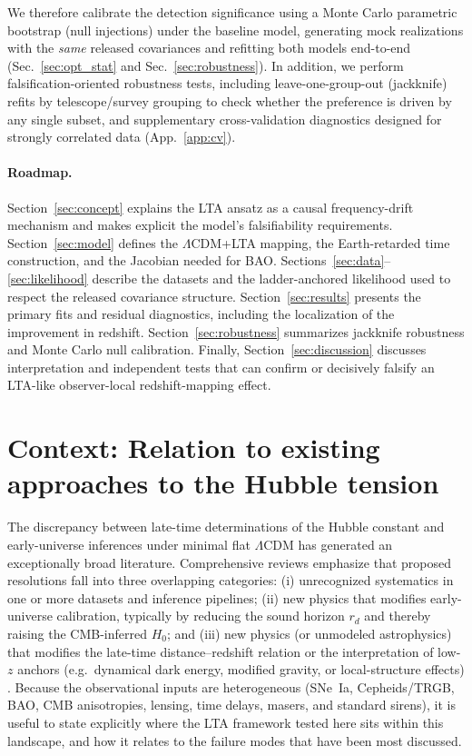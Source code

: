 \documentclass[10pt]{article}
\begin{document}
We therefore calibrate the detection significance using a Monte Carlo parametric bootstrap (null
injections) under the baseline model, generating mock realizations with the \emph{same} released
covariances and refitting both models end-to-end (Sec.~\ref{sec:opt_stat} and
Sec.~\ref{sec:robustness}).
In addition, we perform falsification-oriented robustness tests, including leave-one-group-out
(jackknife) refits by telescope/survey grouping to check whether the preference is driven by any
single subset, and supplementary cross-validation diagnostics designed for strongly correlated data
(App.~\ref{app:cv}).

\paragraph{Roadmap.}
Section~\ref{sec:concept} explains the LTA ansatz as a causal frequency-drift mechanism and makes
explicit the model’s falsifiability requirements.
Section~\ref{sec:model} defines the $\Lambda$CDM+LTA mapping, the Earth-retarded time construction,
and the Jacobian needed for BAO.
Sections~\ref{sec:data}--\ref{sec:likelihood} describe the datasets and the ladder-anchored
likelihood used to respect the released covariance structure.
Section~\ref{sec:results} presents the primary fits and residual diagnostics, including the
localization of the improvement in redshift.
Section~\ref{sec:robustness} summarizes jackknife robustness and Monte Carlo null calibration.
Finally, Section~\ref{sec:discussion} discusses interpretation and independent tests that can
confirm or decisively falsify an LTA-like observer-local redshift-mapping effect.

\section{Context: Relation to existing approaches to the Hubble tension}
\label{sec:related_work}

The discrepancy between late-time determinations of the Hubble constant and early-universe inferences
under minimal flat $\Lambda$CDM has generated an exceptionally broad literature.
Comprehensive reviews emphasize that proposed resolutions fall into three overlapping categories:
(i) unrecognized systematics in one or more datasets and inference pipelines;
(ii) new physics that modifies early-universe calibration, typically by reducing the sound horizon
$r_d$ and thereby raising the CMB-inferred $H_0$; and (iii) new physics (or unmodeled astrophysics)
that modifies the late-time distance--redshift relation or the interpretation of low-$z$ anchors
(e.g.\ dynamical dark energy, modified gravity, or local-structure effects)
\cite{DiValentino2021Review,Verde2019Tensions}.
Because the observational inputs are heterogeneous (SNe~Ia, Cepheids/TRGB, BAO, CMB anisotropies,
lensing, time delays, masers, and standard sirens), it is useful to state explicitly where the LTA
framework tested here sits within this landscape, and how it relates to the failure modes that have
been most discussed.
\end{document}
